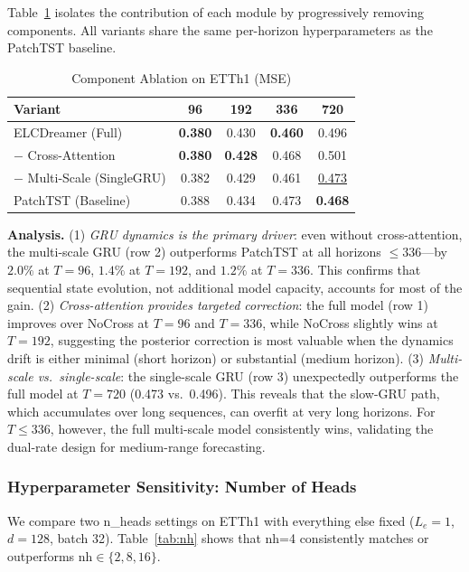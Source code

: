 \documentclass[conference]{IEEEtran}
\begin{document}
Table~\ref{tab:ablation} isolates the contribution of each module by progressively removing components. All variants share the same per-horizon hyperparameters as the PatchTST baseline.

\begin{table}[htbp]
\caption{Component Ablation on ETTh1 (MSE)}
\begin{center}
{\small
\begin{tabular}{lcccc}
\toprule
Variant & 96 & 192 & 336 & 720 \\
\midrule
ELCDreamer (Full) & \textbf{0.380} & 0.430 & \textbf{0.460} & 0.496 \\
$-$ Cross-Attention & \textbf{0.380} & \textbf{0.428} & 0.468 & 0.501 \\
$-$ Multi-Scale (SingleGRU) & 0.382 & 0.429 & 0.461 & \uline{0.473} \\
PatchTST (Baseline) & 0.388 & 0.434 & 0.473 & \textbf{0.468} \\
\bottomrule
\end{tabular}
}
\label{tab:ablation}
\end{center}
\end{table}

\textbf{Analysis.} (1) \emph{GRU dynamics is the primary driver}: even without cross-attention, the multi-scale GRU (row 2) outperforms PatchTST at all horizons $\leq 336$---by $2.0\%$ at $T{=}96$, $1.4\%$ at $T{=}192$, and $1.2\%$ at $T{=}336$. This confirms that sequential state evolution, not additional model capacity, accounts for most of the gain.
(2) \emph{Cross-attention provides targeted correction}: the full model (row 1) improves over NoCross at $T{=}96$ and $T{=}336$, while NoCross slightly wins at $T{=}192$, suggesting the posterior correction is most valuable when the dynamics drift is either minimal (short horizon) or substantial (medium horizon).
(3) \emph{Multi-scale vs.\ single-scale}: the single-scale GRU (row 3) unexpectedly outperforms the full model at $T{=}720$ (0.473 vs.\ 0.496). This reveals that the slow-GRU path, which accumulates over long sequences, can overfit at very long horizons. For $T{\leq}336$, however, the full multi-scale model consistently wins, validating the dual-rate design for medium-range forecasting.

\subsubsection{Hyperparameter Sensitivity: Number of Heads}

We compare two n\_heads settings on ETTh1 with everything else fixed ($L_e{=}1$, $d{=}128$, batch 32). Table~\ref{tab:nh} shows that nh=4 consistently matches or outperforms nh$\in\{2,8,16\}$.
\end{document}
